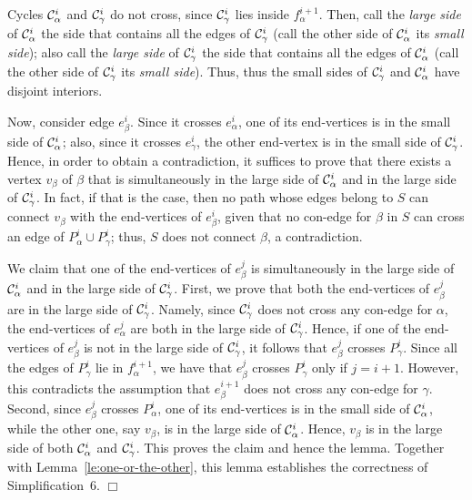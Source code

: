 \documentclass[letter,runningheads]{llncs}
\renewenvironment{proof}
{{\em Proof.\ }}{\hspace*{\fill}$\Box$\par\vspace{2mm}}
\begin{document}
\begin{proof}
Cycles ${\cal C}^{i}_{\alpha}$ and ${\cal C}^{i}_{\gamma}$ do not cross, since ${\cal C}^{i}_{\gamma}$ lies inside $f^{i+1}_{\alpha}$. Then, call the {\em large side} of ${\cal C}^{i}_{\alpha}$ the side that contains all the edges of ${\cal C}^{i}_{\gamma}$ (call the other side of ${\cal C}^{i}_{\alpha}$ its {\em small side}); also call the {\em large side} of ${\cal C}^{i}_{\gamma}$ the side that contains all the edges of ${\cal C}^{i}_{\alpha}$ (call the other side of ${\cal C}^{i}_{\gamma}$ its {\em small side}). Thus, thus the small sides of ${\cal C}^{i}_{\gamma}$ and ${\cal C}^{i}_{\alpha}$ have disjoint interiors.

Now, consider edge $e^i_{\beta}$. Since it crosses $e^i_{\alpha}$, one of its end-vertices is in the small side of ${\cal C}^{i}_{\alpha}$; also, since it crosses $e^{i}_{\gamma}$, the other end-vertex is in the small side of ${\cal C}^{i}_{\gamma}$. Hence, in order to obtain a contradiction, it suffices to prove that there exists a vertex $v_{\beta}$ of $\beta$ that is simultaneously in the large side of ${\cal C}^{i}_{\alpha}$ and in the large side of ${\cal C}^{i}_{\gamma}$. In fact, if that is the case, then no path whose edges belong to $S$ can connect $v_{\beta}$ with the end-vertices of $e^i_{\beta}$, given that no con-edge for $\beta$ in $S$ can cross an edge of $P^{i}_{\alpha} \cup P^{i}_{\gamma}$; thus, $S$ does not connect $\beta$, a contradiction.

We claim that one of the end-vertices of $e^j_\beta$ is simultaneously in the large side of ${\cal C}^{i}_{\alpha}$ and in the large side of ${\cal C}^{i}_{\gamma}$. First, we prove that both the end-vertices of $e^j_\beta$ are in the large side of ${\cal C}^{i}_{\gamma}$. Namely, since ${\cal C}^{i}_{\gamma}$ does not cross any con-edge for $\alpha$, the end-vertices of $e^j_\alpha$ are both in the large side of ${\cal C}^{i}_{\gamma}$. Hence, if one of the end-vertices of $e^j_\beta$ is not in the large side of ${\cal C}^{i}_{\gamma}$, it follows that $e^j_\beta$ crosses $P^{i}_{\gamma}$. Since all the edges of $P^{i}_{\gamma}$ lie in $f^{i+1}_{\alpha}$, we have that $e^j_\beta$ crosses $P^{i}_{\gamma}$ only if $j=i+1$. However, this contradicts the assumption that $e^{i+1}_\beta$ does not cross any con-edge for $\gamma$. Second, since $e^j_\beta$ crosses $P^{i}_{\alpha}$, one of its end-vertices is in the small side of ${\cal C}^{i}_{\alpha}$, while the other one, say $v_{\beta}$, is in the large side of ${\cal C}^{i}_{\alpha}$. Hence, $v_{\beta}$ is in the large side of both ${\cal C}^{i}_{\alpha}$ and ${\cal C}^{i}_{\gamma}$. This proves the claim and hence the lemma. Together with Lemma~\ref{le:one-or-the-other}, this lemma establishes the correctness of {\sc Simplification~6}.
\end{proof}
\end{document}
